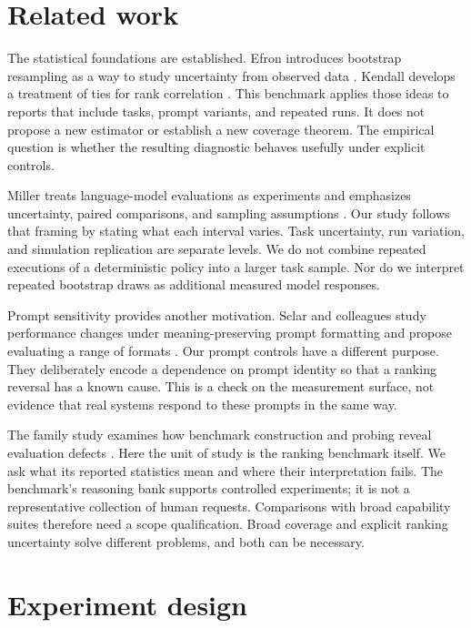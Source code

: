 \documentclass{article}
\begin{document}
\section{Related work}
The statistical foundations are established. Efron introduces bootstrap resampling as a way to study uncertainty from observed data \citep{efron}. Kendall develops a treatment of ties for rank correlation \citep{kendall}. This benchmark applies those ideas to reports that include tasks, prompt variants, and repeated runs. It does not propose a new estimator or establish a new coverage theorem. The empirical question is whether the resulting diagnostic behaves usefully under explicit controls.\par
Miller treats language-model evaluations as experiments and emphasizes uncertainty, paired comparisons, and sampling assumptions \citep{miller}. Our study follows that framing by stating what each interval varies. Task uncertainty, run variation, and simulation replication are separate levels. We do not combine repeated executions of a deterministic policy into a larger task sample. Nor do we interpret repeated bootstrap draws as additional measured model responses.\par
Prompt sensitivity provides another motivation. Sclar and colleagues study performance changes under meaning-preserving prompt formatting and propose evaluating a range of formats \citep{sclar}. Our prompt controls have a different purpose. They deliberately encode a dependence on prompt identity so that a ranking reversal has a known cause. This is a check on the measurement surface, not evidence that real systems respond to these prompts in the same way.\par
The family study examines how benchmark construction and probing reveal evaluation defects \citep{family}. Here the unit of study is the ranking benchmark itself. We ask what its reported statistics mean and where their interpretation fails. The benchmark's reasoning bank supports controlled experiments; it is not a representative collection of human requests. Comparisons with broad capability suites therefore need a scope qualification. Broad coverage and explicit ranking uncertainty solve different problems, and both can be necessary.\par
\section{Experiment design}
\end{document}
